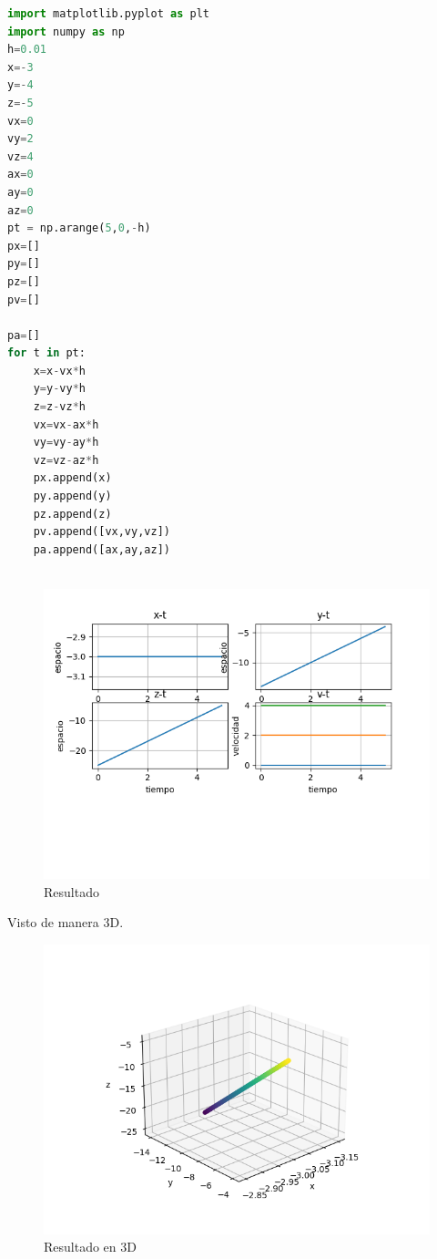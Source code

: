 \documentclass{article}
\begin{document}
\begin{flushleft}
\begin{enumerate}
\begin{itemize}
        \begin{lstlisting}[language=Python,caption=Ejercicio 1]
import matplotlib.pyplot as plt
import numpy as np
h=0.01
x=-3
y=-4
z=-5
vx=0
vy=2
vz=4
ax=0
ay=0
az=0
pt = np.arange(5,0,-h)
px=[]
py=[]
pz=[]
pv=[]

pa=[]
for t in pt:
    x=x-vx*h
    y=y-vy*h
    z=z-vz*h
    vx=vx-ax*h
    vy=vy-ay*h
    vz=vz-az*h
    px.append(x)
    py.append(y)
    pz.append(z)
    pv.append([vx,vy,vz])
    pa.append([ax,ay,az])
    
    \end{lstlisting}
    
    \begin{figure}[H]
    \centering
    \includegraphics[width=1.3\textwidth]{3.1.png}
    \caption{Resultado}
    \end{figure}    
    
        Visto de manera 3D.
        
    \begin{figure}[H]
    \centering
    \includegraphics[width=1.35\textwidth]{3d_1.png}
    \caption{Resultado en 3D}
    \end{figure}
    

\end{itemize}
\end{enumerate}
\end{flushleft}
\end{document}
